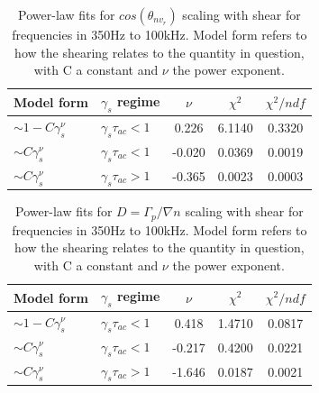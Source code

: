 \documentclass[aip,pop,amsmath,amssymb,reprint,superscriptaddress]{revtex4-1} %
\begin{document}
\begin{table}
\caption{\label{tab:table4}Power-law fits for $cos(\theta_{nv_{r}})$ scaling with shear for frequencies in 350Hz to 100kHz. Model form refers to how the shearing relates to the quantity in question, with C a constant and $\nu$ the power exponent.}
\begin{ruledtabular}
\begin{tabular}{llccc}
Model form&$\gamma_{s}$ regime&$\nu$&$\chi^2$&$\chi^2/ndf$\\
\hline
$\sim 1-C\gamma_{s}^\nu$&$\gamma_{s}\tau_{ac}<1$ &0.226   &6.1140    &0.3320\\
$\sim C\gamma_{s}^\nu$&$\gamma_{s}\tau_{ac}<1$   &-0.020  &0.0369    &0.0019\\
$\sim C\gamma_{s}^\nu$&$\gamma_{s}\tau_{ac}>1$   &-0.365  &0.0023    &0.0003\\
\end{tabular}
\end{ruledtabular}
\end{table}

\begin{table}
\caption{\label{tab:table5}Power-law fits for $D = \Gamma_{p}/\nabla{n}$ scaling with shear for frequencies in 350Hz to 100kHz. Model form refers to how the shearing relates to the quantity in question, with C a constant and $\nu$ the power exponent.}
\begin{ruledtabular}
\begin{tabular}{llccc}
Model form&$\gamma_{s}$ regime&$\nu$&$\chi^2$&$\chi^2/ndf$\\
\hline
$\sim 1-C\gamma_{s}^\nu$&$\gamma_{s}\tau_{ac}<1$ &0.418   &1.4710    &0.0817\\
$\sim C\gamma_{s}^\nu$&$\gamma_{s}\tau_{ac}<1$   &-0.217  &0.4200    &0.0221\\
$\sim C\gamma_{s}^\nu$&$\gamma_{s}\tau_{ac}>1$   &-1.646  &0.0187    &0.0021\\
\end{tabular}
\end{ruledtabular}
\end{table}
\end{document}
